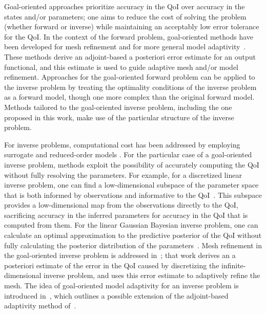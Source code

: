 \documentclass[review,sort&compress]{elsarticle}
\theoremstyle{plain} %
\theoremstyle{definition} %
\begin{document}
Goal-oriented approaches prioritize accuracy in the QoI over accuracy in the states and/or parameters; one aims to reduce the cost of solving the problem (whether forward or inverse) while maintaining an acceptably low error tolerance for the QoI. In the context of the forward problem, goal-oriented methods have been developed for mesh refinement \cite{BecRann01,Park04,PrudOden99,VendDarm00,Yano12} and for more general model adaptivity~\cite{OdenVem00,VemOden01,BraackErn03,OdenPrudetal06}. These methods derive an adjoint-based a posteriori error estimate for an output functional, and this estimate is used to guide adaptive mesh and/or model refinement. Approaches for the goal-oriented forward problem can be applied to the inverse problem by treating the optimality conditions of the inverse problem as a forward model, though one more complex than the original forward model. Methods tailored to the goal-oriented inverse problem, including the one proposed in this work, make use of the particular structure of the inverse problem. 

For inverse problems, computational cost has been addressed by employing surrogate and reduced-order models \cite{MarzNajmRahn07, WangZab04, StefSanNav15, Frangosetal10}. For the particular case of a goal-oriented inverse problem, methods exploit the possibility of accurately computing the QoI without fully resolving the parameters. For example, for a discretized linear inverse problem, one can find a low-dimensional subspace of the parameter space that is both informed by observations and informative to the QoI~\cite{LiebWill13}. This subspace provides a low-dimensional map from the observations directly to the QoI, sacrificing accuracy in the inferred parameters for accuracy in the QoI that is computed from them. For the linear Gaussian Bayesian inverse problem, one can calculate an optimal approximation to the predictive posterior of the QoI without fully calculating the posterior distribution of the parameters~\cite{Span16}. Mesh refinement in the goal-oriented inverse problem is addressed in~\cite{BecVex05}; that work derives an a posteriori estimate of the error in the QoI caused by discretizing the infinite-dimensional inverse problem, and uses this error estimate to adaptively refine the mesh. The idea of goal-oriented model adaptivity for an inverse problem is introduced in~\cite{OdenPrudetal10}, which outlines a possible extension of the adjoint-based adaptivity method of~\cite{OdenPrudetal06}.
\end{document}
